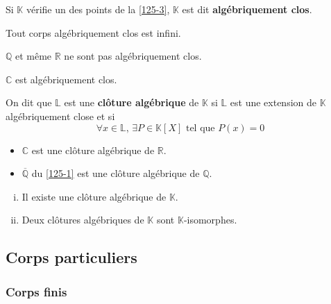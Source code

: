 	\begin{definition}
		Si $\mathbb{K}$ vérifie un des points de la \cref{125-3}, $\mathbb{K}$ est dit \textbf{algébriquement clos}.
	\end{definition}

	\begin{proposition}
		Tout corps algébriquement clos est infini.
	\end{proposition}

	\begin{cexample}
		$\mathbb{Q}$ et même $\mathbb{R}$ ne sont pas algébriquement clos.
	\end{cexample}

	\begin{theorem}
		$\mathbb{C}$ est algébriquement clos.
	\end{theorem}

	\begin{definition}
		On dit que $\mathbb{L}$ est une \textbf{clôture algébrique} de $\mathbb{K}$ si $\mathbb{L}$ est une extension de $\mathbb{K}$ algébriquement close et si
		\[ \forall x \in \mathbb{L}, \, \exists P \in \mathbb{K}[X] \text{ tel que } P(x) = 0 \]
	\end{definition}

	\begin{example}
		\begin{itemize}
			\item $\mathbb{C}$ est une clôture algébrique de $\mathbb{R}$.
			\item $\overline{\mathbb{Q}}$ du \cref{125-1} est une clôture algébrique de $\mathbb{Q}$.
		\end{itemize}
	\end{example}

	\begin{theorem}[Steinitz]
		\begin{enumerate}[(i)]
			\item Il existe une clôture algébrique de $\mathbb{K}$.
			\item Deux clôtures algébriques de $\mathbb{K}$ sont $\mathbb{K}$-isomorphes.
		\end{enumerate}
	\end{theorem}

	\subsection{Corps particuliers}

	\subsubsection{Corps finis}

